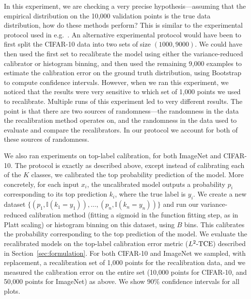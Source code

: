 In this experiment, we are checking a very precise hypothesis---assuming that the empirical distribution on the 10,000 validation points is the true data distribution, how do these methods perform? This is similar to the experimental protocol used in e.g.~\cite{brocker2012empirical}.
An alternative experimental protocol would have been to first split the CIFAR-10 data into two sets of size $(1000, 9000)$.
We could have then used the first set to recalibrate the model using either the variance-reduced calibrator or histogram binning, and then used the remaining 9,000 examples to estimate the calibration error on the ground truth distribution, using Bootstrap to compute confidence intervals.
However, when we ran this experiment, we noticed that the results were very sensitive to which set of 1,000 points we used to recalibrate.
Multiple runs of this experiment led to very different results.
The point is that there are two sources of randomness---the randomness in the data the recalibration method operates on, and the randomness in the data used to evaluate and compare the recalibrators.
In our protocol we account for both of these sources of randomness.

We also ran experiments on top-label calibration, for both ImageNet and CIFAR-10. The protocol is exactly as described above, except instead of calibrating each of the $K$ classes, we calibrated the top probability prediction of the model. More concretely, for each input $x_i$, the uncalibrated model outputs a probability $p_i$ corresponding to its top prediction $k_i$, where the true label is $y_i$. We create a new dataset $\{(p_1, \mathbb{I}(k_1 = y_1)), \dots, (p_n, \mathbb{I}(k_n = y_n))\}$ and run our variance-reduced calibration method (fitting a sigmoid in the function fitting step, as in Platt scaling) or histogram binning on this dataset, using $B$ bins. This calibrates the probability corresponding to the top prediction of the model. We evaluate the recalibrated models on the top-label calibration error metric ($L^2\mbox{-TCE}{}$) described in Section~\ref{sec:formulation}. For both CIFAR-10 and ImageNet we sampled, with replacement, a recalibration set of 1,000 points for the recalibration data, and we measured the calibration error on the entire set (10,000 points for CIFAR-10, and 50,000 points for ImageNet) as above. We show $90\%$ confidence intervals for all plots.


